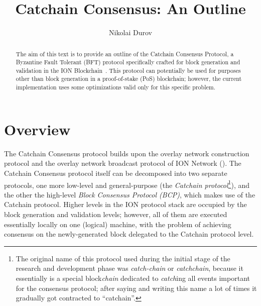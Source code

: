 \documentclass[12pt,oneside]{article}
\title{Catchain Consensus: An Outline}
\author{Nikolai Durov}
\def\mysection#1{\section{#1}\fancyhead[C]{\textsc{Chapter \textbf{\thesection.} #1}}}
\begin{document}
\maketitle

\begin{abstract}
  The aim of this text is to provide an outline of the Catchain Consensus Protocol, a Byzantine Fault Tolerant (BFT) protocol specifically crafted for block generation and validation in the ION Blockchain~\cite{ION}. This protocol can potentially be used for purposes other than block generation in a proof-of-stake (PoS) blockchain; however, the current implementation uses some optimizations valid only for this specific problem.
\end{abstract}

\tableofcontents
\clearpage

\mysection{Overview}\label{sect:overview}
The Catchain Consensus protocol builds upon the overlay network construction protocol and the overlay network broadcast protocol of ION Network (\cite{ION}). The Catchain Consensus protocol itself can be decomposed into two separate protocols, one more low-level and general-purpose (the {\em Catchain protocol\/}\footnote{The original name of this protocol used during the initial stage of the research and development phase was {\em catch-chain} or {\em catchchain}, because it essentially is a special block{\em chain} dedicated to {\em catch\/}ing all events important for the consensus protocol; after saying and writing this name a lot of times it gradually got contracted to ``catchain''.}), and the other the high-level {\em Block Consensus Protocol (BCP)}, which makes use of the Catchain protocol. Higher levels in the ION protocol stack are occupied by the block generation and validation levels; however, all of them are executed essentially locally on one (logical) machine, with the problem of achieving consensus on the newly-generated block delegated to the Catchain protocol level.
\end{document}
